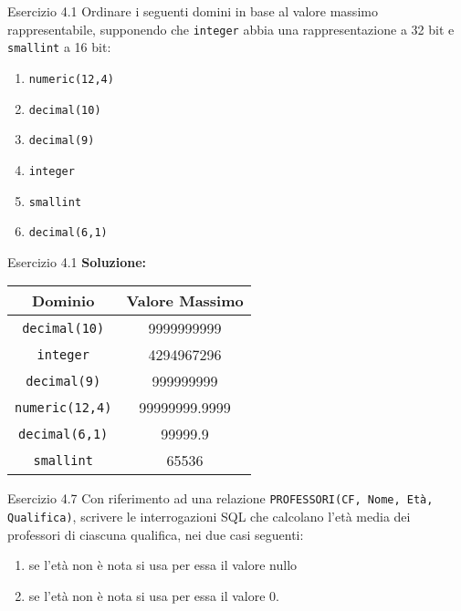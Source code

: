 \begin{frame}{Esercizio 4.1}
         Ordinare i seguenti domini in base al valore massimo rappresentabile, supponendo che \texttt{integer} abbia una rappresentazione a 32 bit e \texttt{smallint} a 16 bit:
        \begin{enumerate}
            \item \texttt{numeric(12,4)}
            \item \texttt{decimal(10)}
            \item \texttt{decimal(9)}
            \item \texttt{integer}
            \item \texttt{smallint}
            \item \texttt{decimal(6,1)}
        \end{enumerate}
\end{frame}

\begin{frame}{Esercizio 4.1}
    \textbf{Soluzione:}
    \begin{table}[h]
        \centering
        \begin{tabular}{|c|c|}
            \hline
            Dominio & Valore Massimo \\
            \hline
            \texttt{decimal(10)} & 9999999999 \\
            \texttt{integer} & 4294967296 \\
            \texttt{decimal(9)} & 999999999 \\
            \texttt{numeric(12,4)} & 99999999.9999 \\
            \texttt{decimal(6,1)} & 99999.9 \\
            \texttt{smallint} & 65536 \\
            \hline
        \end{tabular}
    \end{table}
\end{frame}
\begin{frame}{Esercizio 4.7}
    Con riferimento ad una relazione \texttt{PROFESSORI(CF, Nome, Et\`a, Qualifica)}, scrivere le interrogazioni SQL che calcolano l'et\`a media dei professori di ciascuna qualifica, nei due casi seguenti:
    \begin{enumerate}
        \item se l'et\`a non \`e nota si usa per essa il valore nullo
        \item se l'et\`a non \`e nota si usa per essa il valore 0.
    \end{enumerate}
\end{frame}

